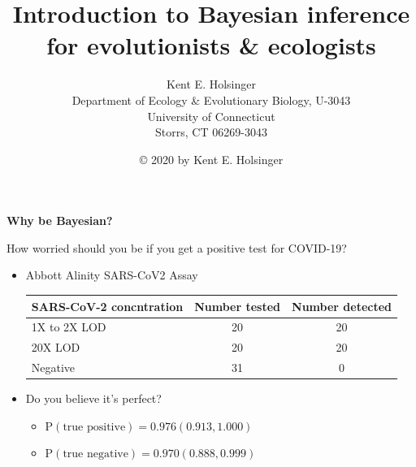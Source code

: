 \documentclass[titlepage,landscape,pdftex]{seminar}
\title{\color{red}Introduction to Bayesian inference for evolutionists \& ecologists}
\author{Kent E. Holsinger \\
  Department of Ecology \& Evolutionary Biology, U-3043 \\
  University of Connecticut \\
  Storrs, CT 06269-3043}
\date{\copyright{} 2020 by Kent E. Holsinger}
\newcommand{\heading}[1]{{\color{red}\large\bf#1}}
\begin{document}
\begin{slide}

  \begin{center}\maketitle\end{center}

  \vfill

\end{slide}

\begin{slide}
  \heading{Why be Bayesian?}

  How worried should you be if you get a positive test for COVID-19?

  \begin{itemize}

  \item Abbott Alinity SARS-CoV2 Assay

    \begin{tabular}{lcc}
      \hline\hline
      SARS-CoV-2 concntration & Number tested & Number detected \\
      \hline
      1X to 2X LOD & 20 & 20 \\
      20X LOD & 20 & 20 \\
      Negative & 31 & 0 \\
      \hline
    \end{tabular}
    
  \item  Do you believe it's perfect?

    \begin{itemize}

    \item $\mbox{P}(\mbox{true positive}) = 0.976 (0.913, 1.000)$

    \item $\mbox{P}(\mbox{true negative}) = 0.970 (0.888, 0.999)$
      
    \end{itemize}
    
  \end{itemize}
  \vfill

\end{slide}
\end{document}
